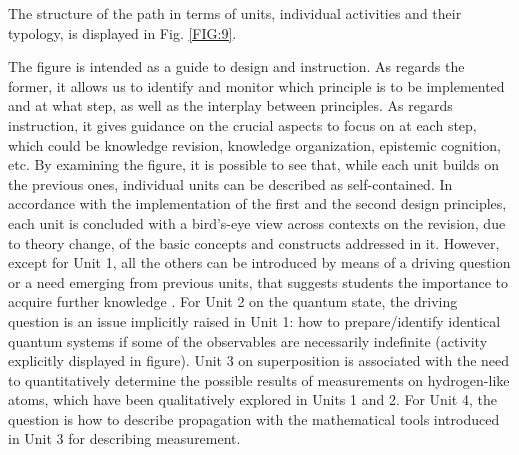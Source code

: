 \documentclass[twocolumn,secnumarabic,amssymb, nobibnotes, aps, prd, nofootinbib]{revtex4-2}
\begin{document}
The structure of the path in terms of units, individual activities and their typology, is displayed in Fig. \ref{FIG:9}.
\begin{figure*}[!htpb]
    \caption{The structure of the sequence as a composition of building blocks: units and individual activities. Two-colour boxes with a white half represent lectures aimed to implement the design principle associated to the other color. The other two-colour boxes represent active-learning strategies that play more than one role.}
    \label{FIG:9}
\end{figure*}
The figure is intended as a guide to design and instruction. As regards the former, it allows us to identify and monitor which principle is to be implemented and at what step, as well as the interplay between principles. As regards instruction, it gives guidance on the crucial aspects to focus on at each step, which could be knowledge revision, knowledge organization, epistemic cognition, etc. By examining the figure, it is possible to see that, while each unit builds on the previous ones, individual units can be described as self-contained. In accordance with the implementation of the first and the second design principles, each unit is concluded with a bird's-eye view across contexts on the revision, due to theory change, of the basic concepts and constructs addressed in it. However, except for Unit 1, all the others can be introduced by means of a driving question or a need emerging from previous units, that suggests students the importance to acquire further knowledge \cite{Wittmann2020}. For Unit 2 on the quantum state, the driving question is an issue implicitly raised in Unit 1: how to prepare/identify identical quantum systems if some of the observables are necessarily indefinite (activity explicitly displayed in figure). Unit 3 on superposition is associated with the need to quantitatively determine the possible results of measurements on hydrogen-like atoms, which have been qualitatively explored in Units 1 and 2. For Unit 4, the question is how to describe propagation with the mathematical tools introduced in Unit 3 for describing measurement.
\end{document}
